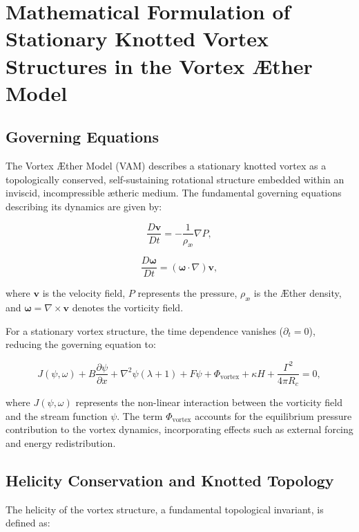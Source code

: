 
\section{Mathematical Formulation of Stationary Knotted Vortex Structures in the Vortex Æther Model}

\subsection{Governing Equations}
The Vortex Æther Model (VAM) describes a stationary knotted vortex as a topologically conserved, self-sustaining rotational structure embedded within an inviscid, incompressible ætheric medium. The fundamental governing equations describing its dynamics are given by:

\begin{equation*}
\frac{D \mathbf{v}}{Dt} = -\frac{1}{\rho_{\text{\ae}}} \nabla P,
\end{equation*}

\begin{equation*}
\frac{D \boldsymbol{\omega}}{Dt} = (\boldsymbol{\omega} \cdot \nabla) \mathbf{v},
\end{equation*}

where $\mathbf{v}$ is the velocity field, $P$ represents the pressure, $\rho_{\text{\ae}}$ is the Æther density, and $\boldsymbol{\omega} = \nabla \times \mathbf{v}$ denotes the vorticity field.

For a stationary vortex structure, the time dependence vanishes ($\partial_t = 0$), reducing the governing equation to:

\begin{equation*}
J(\psi, \omega) + B \frac{\partial \psi}{\partial x} + \nabla^2 \psi (\lambda + 1) + F \psi + \Phi_{\text{vortex}} + \kappa H + \frac{\Gamma^2}{4 \pi R_c} = 0,
\end{equation*}

where $J(\psi, \omega)$ represents the non-linear interaction between the vorticity field and the stream function $\psi$. The term $\Phi_{\text{vortex}}$ accounts for the equilibrium pressure contribution to the vortex dynamics, incorporating effects such as external forcing and energy redistribution.

\subsection{Helicity Conservation and Knotted Topology}
The helicity of the vortex structure, a fundamental topological invariant, is defined as:

